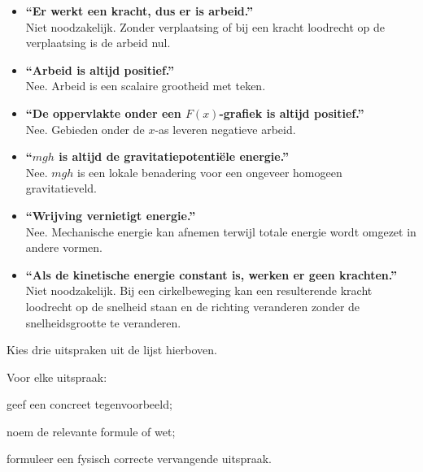 \documentclass{ximera}
\begin{document}

\begin{itemize}
  \item \textbf{``Er werkt een kracht, dus er is arbeid.''}\\
        Niet noodzakelijk. Zonder verplaatsing of bij een kracht loodrecht op
        de verplaatsing is de arbeid nul.

  \item \textbf{``Arbeid is altijd positief.''}\\
        Nee. Arbeid is een scalaire grootheid met teken.

  \item \textbf{``De oppervlakte onder een $F(x)$-grafiek is altijd positief.''}\\
        Nee. Gebieden onder de $x$-as leveren negatieve arbeid.

  \item \textbf{``$mgh$ is altijd de gravitatiepotentiële energie.''}\\
        Nee. $mgh$ is een lokale benadering voor een ongeveer homogeen
        gravitatieveld.

  \item \textbf{``Wrijving vernietigt energie.''}\\
        Nee. Mechanische energie kan afnemen terwijl totale energie wordt
        omgezet in andere vormen.

  \item \textbf{``Als de kinetische energie constant is, werken er geen
        krachten.''}\\
        Niet noodzakelijk. Bij een cirkelbeweging kan een resulterende kracht
        loodrecht op de snelheid staan en de richting veranderen zonder de
        snelheidsgrootte te veranderen.
\end{itemize}


\begin{oefening}{\oefU\ESS}

Kies drie uitspraken uit de lijst hierboven.

Voor elke uitspraak:

\begin{question}
geef een concreet tegenvoorbeeld;
\end{question}

\begin{question}
noem de relevante formule of wet;
\end{question}

\begin{question}
formuleer een fysisch correcte vervangende uitspraak.
\end{question}

\end{oefening}
\end{document}

